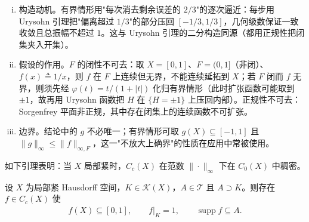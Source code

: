 \documentclass[../main.tex]{subfiles}
\begin{document}
\begin{remark}\label{remark:appA-Tietze}
\begin{enumerate}[(i)]
\item 构造动机。有界情形用"每次消去剩余误差的 $2/3$"的逐次逼近：每步用 Urysohn 引理把"偏离超过 $1/3$"的部分压回 $[-1/3,1/3]$，几何级数保证一致收敛且总振幅不超过 $1$。这与 Urysohn 引理的二分构造同源（都用正规性把闭集夹入开集）。
\item 假设的作用。$F$ 的闭性不可去：取 $X=[0,1]$、$F=(0,1]$（非闭）、$f(x)\triangleq1/x$，则 $f$ 在 $F$ 上连续但无界，不能连续延拓到 $X$；若 $F$ 闭而 $f$ 无界，则须先经 $\varphi(t)=t/(1+|t|)$ 化归有界情形（此时扩张函数可能取到 $\pm1$，故再用 Urysohn 函数把 $H$ 在 $\{H=\pm1\}$ 上压回内部）。正规性不可去：Sorgenfrey 平面非正规，其中存在闭集上的连续函数不可扩张。
\item 边界。结论中的 $g$ 不必唯一；有界情形可取 $g(X)\subseteq[-1,1]$ 且 $\|g\|_\infty\leqslant\|f\|_{\infty,F}$，这一"不放大上确界"的性质在应用中常被使用。
\end{enumerate}
\end{remark}

如下引理表明：当 $X$ 局部紧时，$C_c(X)$ 在范数 $\|\cdot\|_\infty$ 下在 $C_0(X)$ 中稠密。

\begin{lemma}\label{lemma:appA-Urysohn}\label{lemma:appA-光滑截断}
设 $X$ 为局部紧 Hausdorff 空间，$K\in\mathcal{K}(X)$，$A\in\mathscr{T}$ 且 $A\supset K$。则存在 $f\in C_c(X)$ 使
\begin{align*}
f(X)\subseteq[0,1],\qquad f|_K=1,\qquad \operatorname{supp}f\subseteq A.
\end{align*}
\end{lemma}
\end{document}
